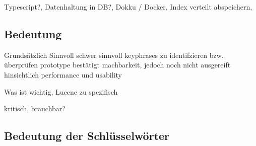 Typescript?, Datenhaltung in DB?, Dokku / Docker, Index verteilt abspeichern, 

\subsection{Bedeutung}

Grundsätzlich Sinnvoll
schwer sinnvoll keyphrases zu identifzieren bzw. überprüfen
prototype bestätigt machbarkeit, jedoch noch nicht ausgereift hinsichtlich performance und usability


Was ist wichtig, Lucene zu spezifisch

kritisch, brauchbar?

\subsection{Bedeutung der Schlüsselwörter}

